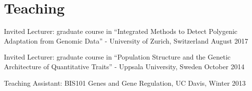 \documentclass[letterpaper]{article}
\renewenvironment{itemize}{
  \begin{list}{}{
    \setlength{\leftmargin}{1.5em}
  }
}{
  \end{list}
}
\begin{document}
\section*{Teaching}
\begin{itemize}
\item Invited Lecturer: graduate course in ``Integrated Methods to Detect Polygenic Adaptation from Genomic Data'' - University of Zurich, Switzerland August 2017
\item Invited Lecturer: graduate course in ``Population Structure and the Genetic Architecture of Quantitative Traits'' - Uppsala University, Sweden October 2014
\item Teaching Assistant: BIS101 Genes and Gene Regulation, UC Davis, Winter 2013


\end{itemize}
\end{document}
